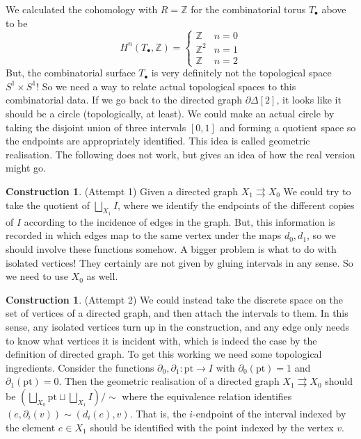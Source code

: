 \documentclass{tufte-handout}
\def\pt {\mathrm{pt}}
\def\ZZ{\mathbb{Z}}
\theoremstyle{definition}
\newtheorem{construction}{Construction}
\newtheorem*{constr}{Construction}
\begin{document}
We calculated the cohomology with $R=\ZZ$ for the combinatorial torus $T_\bullet$ above to be
\[
	H^n(T_\bullet,\ZZ) = \begin{cases}
				\ZZ & n=0\\
				\ZZ^2 & n=1\\
				\ZZ & n=2
			     \end{cases}
\]
But, the combinatorial surface $T_\bullet$ is very definitely not the topological space 
$S^1\times S^1$! So we need a way to relate actual topological spaces to this combinatorial
data. If we go back to the directed graph $\partial\Delta[2]$, it looks like it should be a
circle (topologically, at least). We could make an actual circle by taking the disjoint union
of three intervals $[0,1]$ and forming a quotient space so the endpoints are appropriately
identified. This idea is called geometric realisation. The following does not work, but gives
an idea of how the real version might go.

\begin{constr}
(Attempt 1) Given a directed graph $X_1 \rightrightarrows X_0$ We could try to take the 
quotient of $\bigsqcup_{X_1} I$, where we identify the endpoints of the different copies of 
$I$ according to the incidence of edges in the graph. But, this information is recorded 
in which edges map to the same vertex under the maps $d_0,d_1$, so we should involve these
functions somehow. A bigger problem is what to do with isolated vertices! They certainly are
not given by gluing intervals in any sense. So we need to use $X_0$ as well.
\end{constr}

\begin{construction}

(Attempt 2) We could instead take the discrete space on the set of vertices of a 
directed graph, and then attach the intervals to them. In this sense, any isolated 
vertices turn up in the construction, and any edge only needs to know what vertices it 
is incident with, which is indeed the case by the definition of directed graph. To get 
this working we need some topological ingredients. Consider the functions 
$\partial_0,\partial_1\colon \pt\to I$ with $\partial_0(\pt) = 1$ and 
$\partial_1(\pt)=0$. Then the geometric realisation of a directed graph $X_1 
\rightrightarrows X_0$ should be $(\bigsqcup_{X_0}\pt \sqcup \bigsqcup_{X_1} I)/\!\sim$ 
where the equivalence relation identifies $(e,\partial_i(v))\sim(d_i(e),v)$. That is, 
the $i$-endpoint of the interval indexed by the element $e\in X_1$ should be identified 
with the point indexed by the vertex $v$. 
\end{construction}
\end{document}
